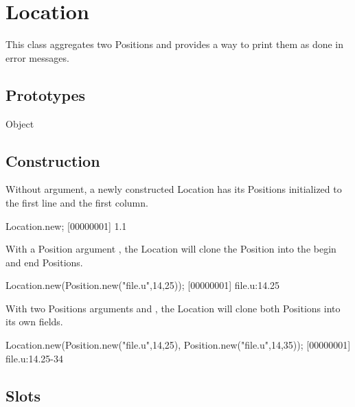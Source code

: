 
\section{Location}

This class aggregates two Positions and provides a way to print them as done
in error messages.

\subsection{Prototypes}
\begin{refObjects}
\item[Object]
\end{refObjects}

\subsection{Construction}

Without argument, a newly constructed Location has its Positions initialized
to the first line and the first column.

\begin{urbiscript}[firstnumber=1]
Location.new;
[00000001] 1.1
\end{urbiscript}

With a Position argument , the Location will clone the Position into
the begin and end Positions.

\begin{urbiscript}[firstnumber=1]
Location.new(Position.new("file.u",14,25));
[00000001] file.u:14.25
\end{urbiscript}

With two Positions arguments  and , the Location will
clone both Positions into its own fields.

\begin{urbiscript}[firstnumber=1]
Location.new(Position.new("file.u",14,25), Position.new("file.u",14,35));
[00000001] file.u:14.25-34
\end{urbiscript}

\subsection{Slots}

